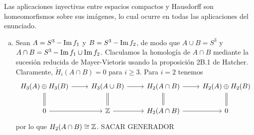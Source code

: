 \documentclass[twoside]{article}
\begin{document}
\begin{solucion}
Las aplicaciones  inyectivas entre espacios compactos y Hausdorff son homeomorfismos sobre sus imágenes, lo cual ocurre en todas las aplicaciones del enunciado. 
%
%
%
%


\begin{enumerate}[(a)]
\item Sean $A=S^3-\operatorname{Im} f_1$ y $B=S^3-\operatorname{Im} f_2$, de modo que $A\cup B=S^3$ y $A\cap B=S^3-\operatorname{Im} f_1\cup \operatorname{Im} f_2$. Claculamos la homología de $A\cap B$ mediante la sucesión reducida de Mayer-Vietoris usando la proposición 2B.1 de Hatcher. Claramente, $\widetilde{H}_i(A\cap B)=0$ para $i\geq 3$. Para $i=2$ tenemos
\[
\begin{tikzcd}
H_3(A)\oplus H_3(B)\arrow[r]\arrow[d, equals] & H_3(A\cup B)\arrow[r]\arrow[d, equals] & H_2(A\cap B)\arrow[r]\arrow[d,equals] & H_2(A)\oplus H_2(B)\arrow[d, equals]\\
0 \arrow[r] & \Z\arrow[r] & H_2(A\cap B)\arrow[r] & 0
\end{tikzcd}
\]
por lo que $H_2(A\cap B)\cong \mathbb{Z}$. SACAR GENERADOR


\end{enumerate}
\end{solucion}
\end{document}
